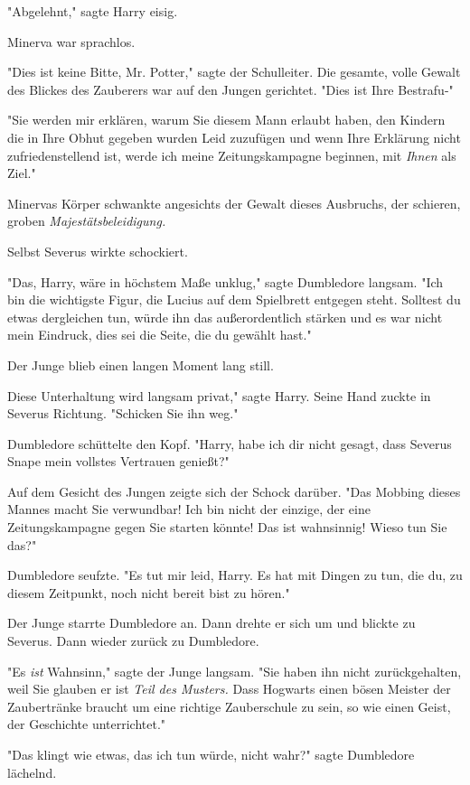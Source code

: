 {"Abgelehnt," sagte Harry eisig.

Minerva war sprachlos.

"Dies ist keine Bitte, Mr. Potter," sagte der Schulleiter. Die gesamte, volle Gewalt des Blickes des Zauberers war auf den Jungen gerichtet. "Dies ist Ihre Bestrafu-"

"Sie werden mir erklären, warum Sie diesem Mann erlaubt haben, den Kindern die in Ihre Obhut gegeben wurden Leid zuzufügen und wenn Ihre Erklärung nicht zufriedenstellend ist, werde ich meine Zeitungskampagne beginnen, mit \emph{Ihnen} als Ziel."

Minervas Körper schwankte angesichts der Gewalt dieses Ausbruchs, der schieren, groben \emph{Majestätsbeleidigung.}

Selbst Severus wirkte schockiert.

"Das, Harry, wäre in höchstem Maße unklug," sagte Dumbledore langsam. "Ich bin die wichtigste Figur, die Lucius auf dem Spielbrett entgegen steht. Solltest du etwas dergleichen tun, würde ihn das außerordentlich stärken und es war nicht mein Eindruck, dies sei die Seite, die du gewählt hast."

Der Junge blieb einen langen Moment lang still.

Diese Unterhaltung wird langsam privat," sagte Harry. Seine Hand zuckte in Severus Richtung. "Schicken Sie ihn weg."

Dumbledore schüttelte den Kopf. "Harry, habe ich dir nicht gesagt, dass Severus Snape mein vollstes Vertrauen genießt?"

Auf dem Gesicht des Jungen zeigte sich der Schock darüber. "Das Mobbing dieses Mannes macht Sie verwundbar! Ich bin nicht der einzige, der eine Zeitungskampagne gegen Sie starten könnte! Das ist wahnsinnig! Wieso tun Sie das?"

Dumbledore seufzte. "Es tut mir leid, Harry. Es hat mit Dingen zu tun, die du, zu diesem Zeitpunkt, noch nicht bereit bist zu hören."

Der Junge starrte Dumbledore an. Dann drehte er sich um und blickte zu Severus. Dann wieder zurück zu Dumbledore.

"Es \emph{ist} Wahnsinn," sagte der Junge langsam. "Sie haben ihn nicht zurückgehalten, weil Sie glauben er ist \emph{Teil des Musters.} Dass Hogwarts einen bösen Meister der Zaubertränke braucht um eine richtige Zauberschule zu sein, so wie einen Geist, der Geschichte unterrichtet."

"Das klingt wie etwas, das ich tun würde, nicht wahr?" sagte Dumbledore lächelnd.

}
